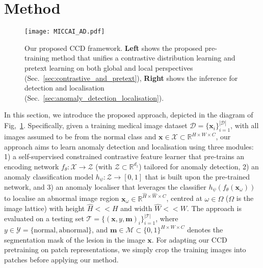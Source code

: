 \documentclass[runningheads]{llncs}
\begin{document}
\section{Method}


\begin{figure}
\begin{center}
\texttt{[image: MICCAI\_AD.pdf]}
\end{center}
\caption{Our proposed CCD framework. \textbf{Left} shows the proposed pre-training method that unifies a contrastive distribution learning and pretext learning on both global and local perspectives (Sec.~\ref{sec:contrastive_and_pretext}),  \textbf{Right} shows the inference for detection and localisation (Sec.~\ref{sec:anomaly_detection_localisation}).}
   
\label{fig:framework}
\end{figure}

In this section, we introduce the proposed approach, depicted in the diagram of Fig,~\ref{fig:framework}. 
Specifically, given a training medical image dataset $\mathcal{D} = \{ \mathbf{x}_i \}_{i=1}^{|\mathcal{D}|}$, 
with all images assumed to be from the $\text{normal}$ class and $\mathbf{x} \in \mathcal{X} \subset \mathbb{R}^{H \times W \times C}$, our approach aims to learn anomaly detection and localisation using three modules: 1) a self-supervised constrained contrastive feature learner that pre-trains an encoding network $f_{\theta}:\mathcal{X} \rightarrow \mathcal{Z}$ (with $\mathcal{Z} \subset \mathbb{R}^{d_{z}}$) tailored for anomaly detection, 2) an anomaly classification model $h_{\psi}:\mathcal{Z} \rightarrow [0,1]$ that is built upon the pre-trained network, and 3) an anomaly localiser that leverages the classifier $h_{\psi}(f_{\theta}(\mathbf{x}_{\omega}))$ to localise an abnormal image region $\mathbf{x}_{\omega} \in \mathbb{R}^{\hat{H} \times \hat{W} \times C}$, centred at $\omega \in \Omega$ ($\Omega$ is the image lattice) with height $\hat{H} << H$ and width $\hat{W} << W$. 
The approach is evaluated on a testing set $\mathcal{T} = \{ (\mathbf{x},y,\mathbf{m})_i \}_{i=1}^{|\mathcal{T}|}$, where $y \in \mathcal{Y} = \{\text{normal}, \text{abnormal} \}$, and $\mathbf{m}\in \mathcal{M} \subset \{0,1\}^{H \times W \times C}$ denotes the segmentation mask of the lesion in the image $\mathbf{x}$. For adapting our CCD pretraining on patch representations, we simply crop the training images into patches before applying our method. 
\end{document}
